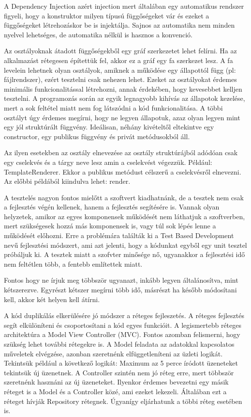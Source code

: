 \documentclass[a4paper,12pt,oneside]{report}
\begin{document}
\begin{justify}
	A Dependency Injection azért injection mert általában egy automatikus rendszer figyeli, hogy a konstruktor milyen típusú függőségeket vár és ezeket a függőségeket létrehozáskor be is injektálja. Sajnos az automatika nem minden nyelvel lehetséges, de automatika nélkül is hasznos a konvenció. \cite{website:dependency_injection_without_container}

	Az osztályoknak átadott függőségekből egy gráf szerkezetet lehet felírni. Ha az alkalmazást rétegesen építettük fel, akkor ez a gráf egy fa szerkezet lesz. A fa levelein lehetnek olyan osztályok, amiknek a működése egy állapottól függ (pl: fájlrendszer), ezért tesztelni csak nehezen lehet. Ezeket az osztályokat érdemes minimális funkcionalitással létrehozni, annak érdekében, hogy kevesebbet kelljen tesztelni. A programozás során az egyik legnagyobb kihívás az állapotok kezelése, mert a sok feltétel miatt nem fog látszódni a kód funkcionalitása. A többi osztályt úgy érdemes megírni, hogy ne legyen állapotuk, azaz olyan legyen mint egy jól struktúrált függvény. Ideálisan, néhány kivételtől eltekintve egy constructor, egy publikus függvény és privát metódusokból áll. 

	Az ilyen esetekben az osztály elnevezése az osztály struktúrájból adódóan csak egy cselekvés és a tárgy neve lesz amin a cselekvést végezzük. Például: TemplateRenderer. Ekkor a publikus metódust célszerű a cselekvésről elnevezni. Az előbbi példából kiindulva lehet: render. 

	A tesztelés nagyon fontos mielőtt a szoftvert kiadhatnánk, de a tesztek nem csak a fejlesztés végén kellenek, hanem a fejlesztés segítésére is. Vannak olyan helyzetek, amikor az egyes komponensek működését nem láthatjuk a szoftverben, mert szükségesek hozzá más komponensek is, vagy túl sok lépés lenne a működését előhozni. Erre a problémára találták ki a Test Based Development nevű fejlesztési módszert, ami azt jelenti, hogy a kódunkat egyből egy unit tesztel próbáljuk ki. A tesztek miatt a szofvter minősége nő, ugyanakkor a fejlesztési idő nem feltétlen több, a fentebb említettek miatt.

	Fontos hogy ne írjuk meg többször ugyanazt, inkább legyen általánosítva, mint kétszerezve. Egyrészt kétszer megírni több idő, másrészt ha később módosítani kell, akkor két helyen kell átírni. 

	A kód duplikálás elkerülésére jó módszer a réteges fejleszetés. A réteges fejlesztés segít elkülöníteni és csoportosítani a kód egyes funkcióit. A legismertebb réteges architektúra a Model View Controller (MVC). Fontos azomban felismerni, hogy szükség lehet további rétegekre is. A Model feladata az adatokkal kapcsolatos műveletek elvégzése, azonban szeretnénk elfüggetleníteni az üzleti logikát. Tekintsük például a következő logikát: Maximum az 5 perce íródott üzeneteket tekintsük új üzenetnek. A Controller szintén nem jó réteg erre, mert többször szeretnénk hasznáni az új üzeneteket. Ilyenkor érdemes bevezetni egy másik réteget is a Model és a Controller közé, ami ezeket lekezeli. Általában ezt a réteget hívják Repository rétegnek. Úgyanígy eljárhatunk a többi réteg esetében is.


\end{justify}
\end{document}
